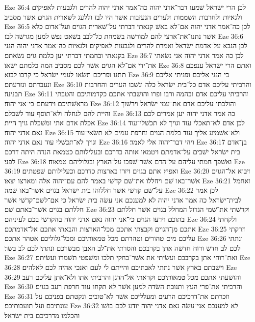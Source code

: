 Eze 36:4  לכן הרי ישׂראל שׁמעו דבר־אדני יהוה כה־אמר אדני יהוה להרים ולגבעות לאפיקים ולגאיות ולחרבות השׁממות ולערים הנעזבות אשׁר היו לבז וללעג לשׁארית הגוים אשׁר מסביב׃
Eze 36:5  לכן כה־אמר אדני יהוה אם־לא באשׁ קנאתי דברתי על־שׁארית הגוים ועל־אדום כלא אשׁר נתנו־את־ארצי להם למורשׁה בשׂמחת כל־לבב בשׁאט נפשׁ למען מגרשׁה לבז׃
Eze 36:6  לכן הנבא על־אדמת ישׂראל ואמרת להרים ולגבעות לאפיקים ולגאיות כה־אמר אדני יהוה הנני בקנאתי ובחמתי דברתי יען כלמת גוים נשׂאתם׃
Eze 36:7  לכן כה אמר אדני יהוה אני נשׂאתי את־ידי אם־לא הגוים אשׁר לכם מסביב המה כלמתם ישׂאו׃
Eze 36:8  ואתם הרי ישׂראל ענפכם תתנו ופריכם תשׂאו לעמי ישׂראל כי קרבו לבוא׃
Eze 36:9  כי הנני אליכם ופניתי אליכם ונעבדתם ונזרעתם׃
Eze 36:10  והרביתי עליכם אדם כל־בית ישׂראל כלה ונשׁבו הערים והחרבות תבנינה׃
Eze 36:11  והרביתי עליכם אדם ובהמה ורבו ופרו והושׁבתי אתכם כקדמותיכם והטבתי מראשׁתיכם וידעתם כי־אני יהוה׃
Eze 36:12  והולכתי עליכם אדם את־עמי ישׂראל וירשׁוך והיית להם לנחלה ולא־תוסף עוד לשׁכלם׃
Eze 36:13  כה אמר אדני יהוה יען אמרים לכם אכלת אדם אתי ומשׁכלת גויך היית׃
Eze 36:14  לכן אדם לא־תאכלי עוד וגויך לא תכשׁלי־עוד נאם אדני יהוה׃
Eze 36:15  ולא־אשׁמיע אליך עוד כלמת הגוים וחרפת עמים לא תשׂאי־עוד וגויך לא־תכשׁלי עוד נאם אדני יהוה׃
Eze 36:16  ויהי דבר־יהוה אלי לאמר׃
Eze 36:17  בן־אדם בית ישׂראל ישׁבים על־אדמתם ויטמאו אותה בדרכם ובעלילותם כטמאת הנדה היתה דרכם לפני׃
Eze 36:18  ואשׁפך חמתי עליהם על־הדם אשׁר־שׁפכו על־הארץ ובגלוליהם טמאוה׃
Eze 36:19  ואפיץ אתם בגוים ויזרו בארצות כדרכם וכעלילותם שׁפטתים׃
Eze 36:20  ויבוא אל־הגוים אשׁר־באו שׁם ויחללו את־שׁם קדשׁי באמר להם עם־יהוה אלה ומארצו יצאו׃
Eze 36:21  ואחמל על־שׁם קדשׁי אשׁר חללוהו בית ישׂראל בגוים אשׁר־באו שׁמה׃
Eze 36:22  לכן אמר לבית־ישׂראל כה אמר אדני יהוה לא למענכם אני עשׂה בית ישׂראל כי אם־לשׁם־קדשׁי אשׁר חללתם בגוים אשׁר־באתם שׁם׃
Eze 36:23  וקדשׁתי את־שׁמי הגדול המחלל בגוים אשׁר חללתם בתוכם וידעו הגוים כי־אני יהוה נאם אדני יהוה בהקדשׁי בכם לעיניהם׃
Eze 36:24  ולקחתי אתכם מן־הגוים וקבצתי אתכם מכל־הארצות והבאתי אתכם אל־אדמתכם׃
Eze 36:25  וזרקתי עליכם מים טהורים וטהרתם מכל טמאותיכם ומכל־גלוליכם אטהר אתכם׃
Eze 36:26  ונתתי לכם לב חדשׁ ורוח חדשׁה אתן בקרבכם והסרתי את־לב האבן מבשׂרכם ונתתי לכם לב בשׂר׃
Eze 36:27  ואת־רוחי אתן בקרבכם ועשׂיתי את אשׁר־בחקי תלכו ומשׁפטי תשׁמרו ועשׂיתם׃
Eze 36:28  וישׁבתם בארץ אשׁר נתתי לאבתיכם והייתם לי לעם ואנכי אהיה לכם לאלהים׃
Eze 36:29  והושׁעתי אתכם מכל טמאותיכם וקראתי אל־הדגן והרביתי אתו ולא־אתן עליכם רעב׃
Eze 36:30  והרביתי את־פרי העץ ותנובת השׂדה למען אשׁר לא תקחו עוד חרפת רעב בגוים׃
Eze 36:31  וזכרתם את־דרכיכם הרעים ומעלליכם אשׁר לא־טובים ונקטתם בפניכם על עונתיכם ועל תועבותיכם׃
Eze 36:32  לא למענכם אני־עשׂה נאם אדני יהוה יודע לכם בושׁו והכלמו מדרכיכם בית ישׂראל׃
